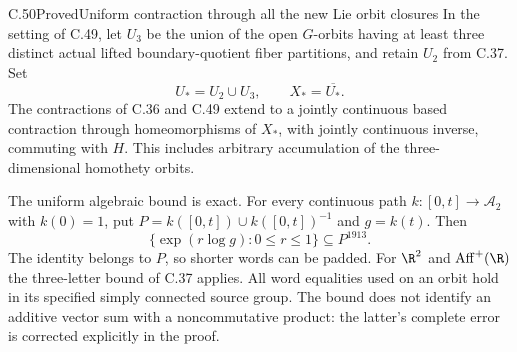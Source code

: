 \begin{claim}{C.50}{Proved}{Uniform contraction through all the new Lie orbit closures}
In the setting of C.49, let $U_3$ be the union of the open
$G$-orbits having at least three distinct actual lifted
boundary-quotient fiber partitions, and retain $U_2$ from C.37.
Set
\[
                  U_*=U_2\cup U_3,\qquad X_*=\overline{U_*}.
                                                        \tag{C.50.1}
\]
The contractions of C.36 and C.49 extend to a jointly
continuous based contraction through homeomorphisms of $X_*$,
with jointly continuous inverse, commuting with $H$.
This includes arbitrary accumulation of the three-dimensional
homothety orbits.

The uniform algebraic bound is exact. For every continuous
path $k:[0,t]\to\mathcal A_2$ with $k(0)=1$, put
$P=k([0,t])\cup k([0,t])^{-1}$ and $g=k(t)$.
Then
\[
        \{\exp(r\log g):0\leq r\leq1\}
                                      \subseteq P^{1913}.
                                                        \tag{C.50.2}
\]
The identity belongs to $P$, so shorter words can be padded.
For $\R^2$ and $\operatorname{Aff}^+(\R)$ the three-letter
bound of C.37 applies. All word equalities used on an orbit
hold in its specified simply connected source group.
The bound does not identify an additive vector sum with a
noncommutative product: the latter's complete error is
corrected explicitly in the proof.
\end{claim}

